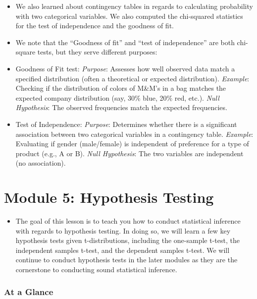 \documentclass[
  letterpaper,
  DIV=11,
  numbers=noendperiod]{scrreprt}
\providecommand{\tightlist}{%
  \setlength{\itemsep}{0pt}\setlength{\parskip}{0pt}}\usepackage{longtable,booktabs,array}
\begin{document}
\begin{itemize}
\tightlist
\item
  We also learned about contingency tables in regards to calculating
  probability with two categorical variables. We also computed the
  chi-squared statistics for the test of independence and the goodness
  of fit.
\item
  We note that the ``Goodness of fit'' and ``test of independence'' are
  both chi-square tests, but they serve different purposes:
\item
  Goodness of Fit test: \emph{Purpose}: Assesses how well observed data
  match a specified distribution (often a theoretical or expected
  distribution). \emph{Example}: Checking if the distribution of colors
  of M\&M's in a bag matches the expected company distribution (say,
  30\% blue, 20\% red, etc.). \emph{Null Hypothesis}: The observed
  frequencies match the expected frequencies.
\item
  Test of Independence: \emph{Purpose}: Determines whether there is a
  significant association between two categorical variables in a
  contingency table. \emph{Example}: Evaluating if gender (male/female)
  is independent of preference for a type of product (e.g., A or B).
  \emph{Null Hypothesis}: The two variables are independent (no
  association).
\end{itemize}


\chapter{Module 5: Hypothesis
Testing}\label{module-5-hypothesis-testing}

\begin{itemize}
\tightlist
\item
  The goal of this lesson is to teach you how to conduct statistical
  inference with regards to hypothesis testing. In doing so, we will
  learn a few key hypothesis tests given t-distributions, including the
  one-sample t-test, the independent samples t-test, and the dependent
  samples t-test. We will continue to conduct hypothesis tests in the
  later modules as they are the cornerstone to conducting sound
  statistical inference.
\end{itemize}

\subsection{At a Glance}\label{at-a-glance-4}
\end{document}
